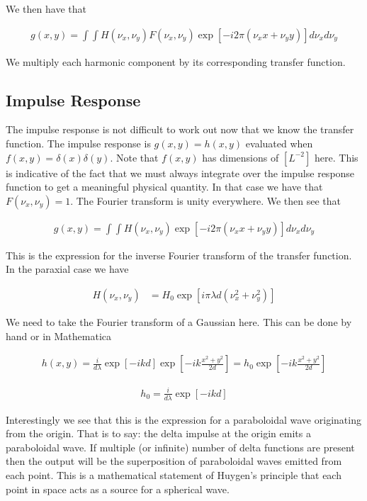 \documentclass[12pt]{article}
\begin{document}
We then have that 

\begin{align}
g(x,y) = \int \int H(\nu_x, \nu_y)F(\nu_x,\nu_y) \exp[-i 2\pi (\nu_x x +\nu_y y)] d\nu_x d\nu_y
\end{align}

We multiply each harmonic component by its corresponding transfer function.

\subsection{Impulse Response}
The impulse response is not difficult to work out now that we know the transfer function. The impulse response is $g(x,y) = h(x,y)$ evaluated when $f(x,y) = \delta(x)\delta(y)$. Note that $f(x,y)$ has dimensions of $[L^{-2}]$ here. This is indicative of the fact that we must always integrate over the impulse response function to get a meaningful physical quantity. In that case we have that $F(\nu_x,\nu_y) = 1$. The Fourier transform is unity everywhere. We then see that 

\begin{align}
g(x,y) = \int \int H(\nu_x, \nu_y) \exp[-i 2\pi (\nu_x x +\nu_y y)] d\nu_x d\nu_y
\end{align}

This is the expression for the inverse Fourier transform of the transfer function. In the paraxial case we have 

\begin{align}
H(\nu_x,\nu_y) &=  H_0 \exp\left[ i \pi \lambda d (\nu_x^2+\nu_y^2)\right]
\end{align}

We need to take the Fourier transform of a Gaussian here. This can be done by hand or in Mathematica

\begin{align}
h(x,y) = \frac{i}{d\lambda} \exp[-ikd] \exp\left[-ik \frac{x^2+y^2}{2d}\right] = h_0 \exp\left[-ik \frac{x^2+y^2}{2d}\right]
\end{align}

\begin{align}
h_0 = \frac{i}{d\lambda} \exp[-ikd]
\end{align}

Interestingly we see that this is the expression for a paraboloidal wave originating from the origin. That is to say: the delta impulse at the origin emits a paraboloidal wave. If multiple (or infinite) number of delta functions are present then the output will be the superposition of paraboloidal waves emitted from each point. This is a mathematical statement of Huygen's principle that each point in space acts as a source for a spherical wave.
\end{document}
